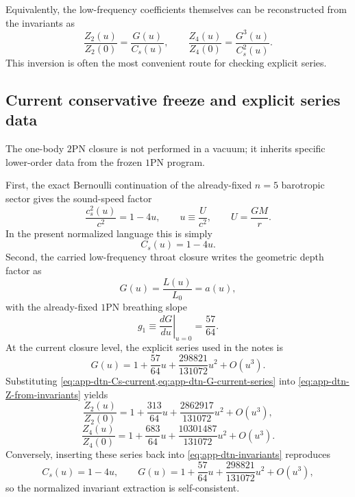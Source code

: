 \documentclass[11pt]{article}
\newcommand{\OnePN}{\mathrm{1PN}}
\newcommand{\TwoPN}{\mathrm{2PN}}
\begin{document}
Equivalently, the low-frequency coefficients themselves can be reconstructed from the
invariants as
\begin{equation}
\frac{Z_2(u)}{Z_2(0)}=\frac{G(u)}{C_s(u)},
\qquad
\frac{Z_4(u)}{Z_4(0)}=\frac{G^3(u)}{C_s^2(u)}.
\label{eq:app-dtn-Z-from-invariants}
\end{equation}
This inversion is often the most convenient route for checking explicit series.

\subsection{Current conservative freeze and explicit series data}
\label{app:one-body-dtn-current-series}

The one-body \(\TwoPN\) closure is not performed in a vacuum; it inherits specific
lower-order data from the frozen \(\OnePN\) program.

First, the exact Bernoulli continuation of the already-fixed \(n=5\) barotropic
sector gives the sound-speed factor
\begin{equation}
\frac{c_s^2(u)}{c^2}=1-4u,
\qquad
u\equiv \frac{U}{c^2},
\qquad
U=\frac{GM}{r}.
\label{eq:app-dtn-cs-bernoulli}
\end{equation}
In the present normalized language this is simply
\begin{equation}
C_s(u)=1-4u.
\label{eq:app-dtn-Cs-current}
\end{equation}
Second, the carried low-frequency throat closure writes the geometric depth factor as
\begin{equation}
G(u)=\frac{L(u)}{L_0}=a(u),
\label{eq:app-dtn-G-a}
\end{equation}
with the already-fixed \(\OnePN\) breathing slope
\begin{equation}
g_1\equiv \left.\frac{dG}{du}\right|_{u=0}=\frac{57}{64}.
\label{eq:app-dtn-g1}
\end{equation}
At the current closure level, the explicit series used in the notes is
\begin{equation}
G(u)=1+\frac{57}{64}u+\frac{298821}{131072}u^2+O(u^3).
\label{eq:app-dtn-G-current-series}
\end{equation}
Substituting \cref{eq:app-dtn-Cs-current,eq:app-dtn-G-current-series} into
\cref{eq:app-dtn-Z-from-invariants} yields
\begin{equation}
\frac{Z_2(u)}{Z_2(0)}
=1+\frac{313}{64}u+\frac{2862917}{131072}u^2+O(u^3),
\label{eq:app-dtn-Z2-series}
\end{equation}
\begin{equation}
\frac{Z_4(u)}{Z_4(0)}
=1+\frac{683}{64}u+\frac{10301487}{131072}u^2+O(u^3).
\label{eq:app-dtn-Z4-series}
\end{equation}
Conversely, inserting these series back into \cref{eq:app-dtn-invariants} reproduces
\begin{equation}
C_s(u)=1-4u,
\qquad
G(u)=1+\frac{57}{64}u+\frac{298821}{131072}u^2+O(u^3),
\label{eq:app-dtn-invariants-current-series}
\end{equation}
so the normalized invariant extraction is self-consistent.
\end{document}
